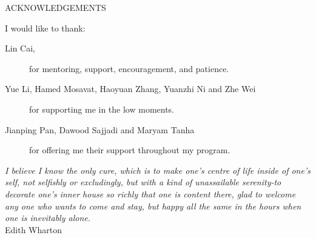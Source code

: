 \newpage
{}

\begin{center}
ACKNOWLEDGEMENTS
\end{center}

\noindent I would like to thank:
\begin{description}
\item[Lin Cai,]
	for  mentoring, support, encouragement, and patience. 
\item[Yue Li, Hamed Mosavat, Haoyuan Zhang, Yuanzhi Ni and Zhe Wei]
	for supporting me in the low moments.
\item[Jianping Pan, Dawood Sajjadi and Maryam Tanha]
	for offering me their support throughout my program.
\end{description}

\begin{flushright}
\textit{I believe I know the only cure, which is to make
one's centre of life inside of one's self, not
selfishly or excludingly, but with a kind of
unassailable serenity-to decorate one's inner house
so richly that one is content there, glad to welcome
any one who wants to come and stay, but happy all
the same in the hours when one is inevitably alone.}
\\
Edith Wharton \\
\end{flushright}
